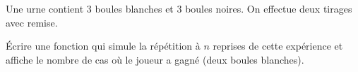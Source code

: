 \begin{exo}{}
	Une urne contient $3$ boules blanches et $3$ boules noires. On effectue deux tirages avec remise.

	Écrire une fonction qui simule la répétition à $n$ reprises de cette expérience et affiche le nombre de cas où le joueur a gagné (deux boules blanches).
\end{exo}
